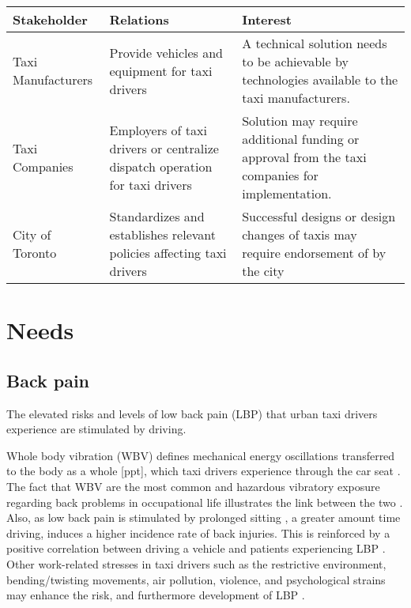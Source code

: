 \documentclass[11pt]{article}
\begin{document}
\begin{center}
    \begin{tabular}{ l p{5cm} p{5cm}}
    Stakeholder & Relations &	Interest \\ \hline
    Taxi Manufacturers & Provide vehicles and equipment for taxi drivers	& 
    A technical solution needs to be achievable by technologies available 
    to the taxi manufacturers. \\ 
    Taxi Companies & Employers of taxi drivers or centralize dispatch 
    operation for taxi drivers	& Solution may require additional funding 
    or approval from the taxi companies for implementation. \\
    City of Toronto & Standardizes and establishes relevant policies 
    affecting taxi drivers \cite{CityofToronto}	& Successful designs or design changes of  
    taxis may require endorsement of by the city  \\
    \end{tabular}
\end{center}

\section{Needs}
\label{sec:needs}
\subsection{Back pain}
The elevated risks and levels of low back pain (LBP) that urban taxi drivers 
experience are stimulated by driving. 

Whole body vibration (WBV) defines mechanical energy oscillations transferred to 
the body as a whole [ppt], which taxi drivers experience \cite{KneePain, Serious} 
through the car seat \cite{ppt}. The fact that WBV are the most common and hazardous 
vibratory exposure regarding back problems in occupational life illustrates the
link between the two \cite{ODrivers@Risk}. Also, as low back pain is stimulated by 
prolonged sitting \cite{Okunribido2008}, a greater amount time driving, induces a 
higher incidence rate of back injuries\cite{Question?}. This is reinforced by a positive 
correlation between driving a vehicle and patients experiencing LBP \cite{ODrivers@Risk}. 
Other work-related stresses in taxi drivers such as the restrictive environment, bending/twisting 
movements, air pollution, violence, and psychological strains may enhance the risk, 
and furthermore development of LBP \cite{KneePain, POSTULATED}. 
\end{document}
